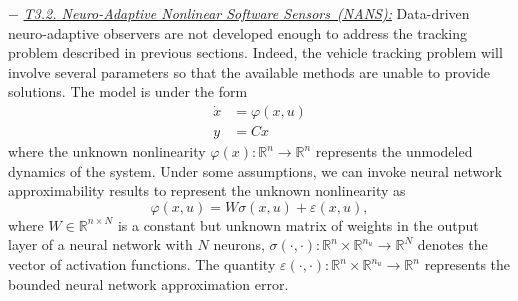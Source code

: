 \documentclass[a4paper,11pt]{article}
\begin{document}
\begin{itemize}[leftmargin=.2in,noitemsep,nolistsep]
%
\subitem$-$ \underline{\it T3.2. Neuro-Adaptive Nonlinear Software Sensors~(NANS):} Data-driven neuro-adaptive observers are not developed enough to address the tracking problem described in previous sections. Indeed, the vehicle tracking problem will involve several parameters so that the available methods are unable to provide solutions. The model is under the form
\begin{subequations}\label{eq:plant}
\begin{align}%
\dot x & = \varphi(x, u)\\
y & = Cx
\end{align}
\end{subequations}
where the unknown nonlinearity $\varphi(x):\mathbb R^{n}\to \mathbb R^{n}$ represents the unmodeled dynamics of the system. Under some assumptions, we can invoke neural network approximability results to represent the unknown nonlinearity as 
\begin{equation}\label{eq:nn_representation_of_g}
\varphi(x,u) = W \sigma(x,u) + \varepsilon(x,u),
\end{equation}
where $W\in\mathbb R^{n\times N}$ is a constant but unknown matrix of weights in the output layer of a neural network with $N$ neurons, $\sigma(\cdot, \cdot): \mathbb R^{n}\times\mathbb{R}^{n_u}\to \mathbb R^N$ denotes the vector of activation functions. The quantity $\varepsilon(\cdot,\cdot): \mathbb R^{n}\times\mathbb{R}^{n_u}\to \mathbb R^{n}$ represents the bounded neural network approximation error.


\end{itemize}
\end{document}
